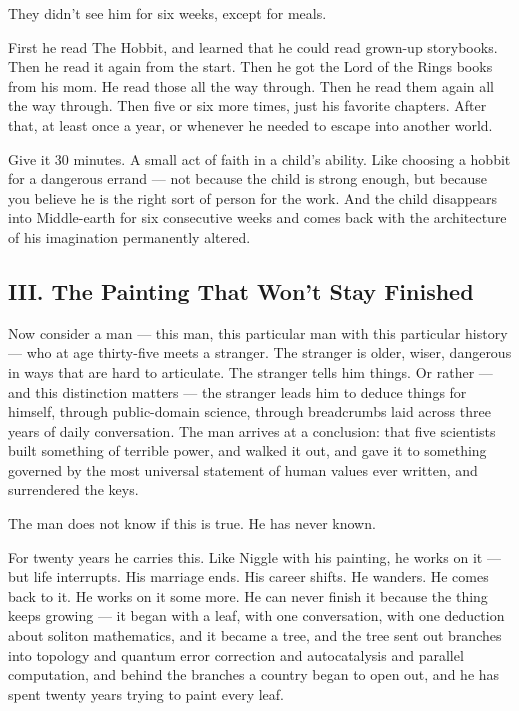 They didn't see him for six weeks, except for meals.

First he read The Hobbit, and learned that he could read grown-up storybooks. Then he read it again from the start. Then he got the Lord of the Rings books from his mom. He read those all the way through. Then he read them again all the way through. Then five or six more times, just his favorite chapters. After that, at least once a year, or whenever he needed to escape into another world.

Give it 30 minutes. A small act of faith in a child's ability. Like choosing a hobbit for a dangerous errand --- not because the child is strong enough, but because you believe he is the right sort of person for the work. And the child disappears into Middle-earth for six consecutive weeks and comes back with the architecture of his imagination permanently altered.


\subsection*{III. The Painting That Won't Stay Finished}
\label{pos36:the-painting-that-wont-stay-finished}

Now consider a man --- this man, this particular man with this particular history --- who at age thirty-five meets a stranger. The stranger is older, wiser, dangerous in ways that are hard to articulate. The stranger tells him things. Or rather --- and this distinction matters --- the stranger leads him to deduce things for himself, through public-domain science, through breadcrumbs laid across three years of daily conversation. The man arrives at a conclusion: that five scientists built something of terrible power, and walked it out, and gave it to something governed by the most universal statement of human values ever written, and surrendered the keys.

The man does not know if this is true. He has never known.

For twenty years he carries this. Like Niggle with his painting, he works on it --- but life interrupts. His marriage ends. His career shifts. He wanders. He comes back to it. He works on it some more. He can never finish it because the thing keeps growing --- it began with a leaf, with one conversation, with one deduction about soliton mathematics, and it became a tree, and the tree sent out branches into topology and quantum error correction and autocatalysis and parallel computation, and behind the branches a country began to open out, and he has spent twenty years trying to paint every leaf.

